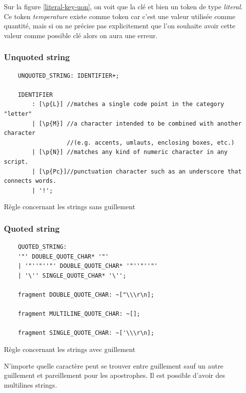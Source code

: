 \documentclass[
    iict, %
    il, %
]{heig-tb}
\begin{document}
Sur la figure \ref{literal-key-uon}, on voit que la clé et bien un token de type \emph{literal}.
Ce token \emph{temperature} existe comme token car c'est une valeur utilisée comme quantité, mais si on ne précise pas explicitement que l'on souhaite avoir cette valeur
comme possible clé alors on aura une erreur.

\subsubsection{Unquoted string}

\begin{listing}[H]
    \begin{verbatim}
    UNQUOTED_STRING: IDENTIFIER+;

    IDENTIFIER
        : [\p{L}] //matches a single code point in the category "letter"
        | [\p{M}] //a character intended to be combined with another character
                  //(e.g. accents, umlauts, enclosing boxes, etc.)
        | [\p{N}] //matches any kind of numeric character in any script.
        | [\p{Pc}]//punctuation character such as an underscore that connects words.
        | '!';
    \end{verbatim}
    \caption{Règle concernant les strings sans guillement}
    \label{unquoted-rule}
\end{listing}

\subsubsection{Quoted string}

\begin{listing}[H]
    \begin{verbatim}
    QUOTED_STRING:
    '"' DOUBLE_QUOTE_CHAR* '"'
    | '"''"''"' DOUBLE_QUOTE_CHAR* '"''"''"'
    | '\'' SINGLE_QUOTE_CHAR* '\'';

    fragment DOUBLE_QUOTE_CHAR: ~["\\\r\n];

    fragment MULTILINE_QUOTE_CHAR: ~[];

    fragment SINGLE_QUOTE_CHAR: ~['\\\r\n];
    \end{verbatim}
    \caption{Règle concernant les strings avec guillement}
    \label{quoted-rule}
\end{listing}

N'importe quelle caractère peut se trouver entre guillement sauf un autre guillement et pareillement pour les apostrophes.
Il est possible d'avoir des multilines strings.
\end{document}

